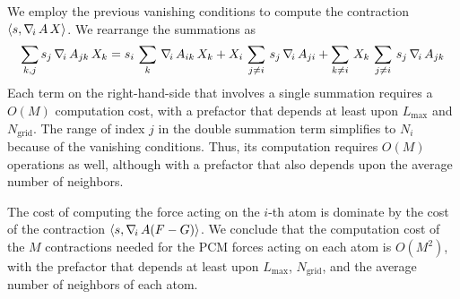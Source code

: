 We employ the previous vanishing conditions to compute the contraction $\langle s , \nabla_{\!i}\, A\,X \rangle$. We rearrange the summations as
\[
\sum_{k,j} s_j \, \nabla_{\!i}\, A_{jk} \, X_k =  s_i \, \sum_k \, \nabla_{\!i}\, A_{ik} \, X_k + X_i \, \sum_{j \not=i} \, s_j \, \nabla_{\!i}\, A_{ji}  + \sum_{k\not=i} \,X_k \,\sum_{j\not=i} \, s_j \, \nabla_{\!i}\, A_{jk}
\]
Each term on the right-hand-side that involves a single summation requires a $O(M)$ computation cost, with a prefactor that depends at least upon $L_\text{max}$ and $N_\text{grid}$. The range of index $j$ in the double summation term simplifies to $N_i$ because of the vanishing conditions. Thus, its computation requires $O(M)$ operations as well, although with a prefactor that also depends upon the average number of neighbors.

The cost of computing the force acting on the $i$-th atom is dominate by the cost of the contraction $\langle s , \nabla_{\!i}\,  A ( F - G ) \rangle$. We conclude that the computation cost of the $M$ contractions needed for the PCM forces acting on each atom is $O(M^2)$, with the prefactor that depends at least upon $L_\text{max}$, $N_\text{grid}$, and the average number of neighbors of each atom.


%

